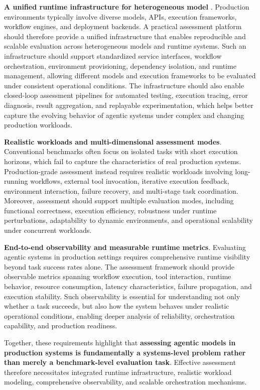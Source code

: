 {\bf A unified runtime infrastructure for heterogeneous model }.
Production environments typically involve diverse models, APIs, execution frameworks, workflow engines, and deployment backends. A practical assessment platform should therefore provide a unified infrastructure that enables reproducible and scalable evaluation across heterogeneous models and runtime systems. Such an infrastructure should support standardized service interfaces, workflow orchestration, environment provisioning, dependency isolation, and runtime management, allowing different models and execution frameworks to be evaluated under consistent operational conditions.
The infrastructure should also enable closed-loop assessment pipelines for automated testing, execution tracing, error diagnosis, result aggregation, and replayable experimentation, which helps better capture the evolving behavior of agentic systems under complex and changing production workloads.

{\bf Realistic workloads and multi-dimensional assessment modes}.
Conventional benchmarks often focus on isolated tasks with short execution horizons, which fail to capture the characteristics of real production systems. Production-grade assessment instead requires realistic workloads involving long-running workflows, external tool invocation, iterative execution feedback, environment interaction, failure recovery, and multi-stage task coordination. Moreover, assessment should support multiple evaluation modes, including functional correctness, execution efficiency, robustness under runtime perturbations, adaptability to dynamic environments, and operational scalability under concurrent workloads.

{\bf End-to-end observability and measurable runtime metrics}.
Evaluating agentic systems in production settings requires comprehensive runtime visibility beyond task success rates alone. The assessment framework should provide observable metrics spanning workflow execution, tool interaction, runtime behavior, resource consumption, latency characteristics, failure propagation, and execution stability. Such observability is essential for understanding not only whether a task succeeds, but also how the system behaves under realistic operational conditions, enabling deeper analysis of reliability, orchestration capability, and production readiness.

Together, these requirements highlight that \textbf{assessing agentic models in production systems is fundamentally a systems-level problem rather than merely a benchmark-level evaluation task}. Effective assessment therefore necessitates integrated runtime infrastructure, realistic workload modeling, comprehensive observability, and scalable orchestration mechanisms.


